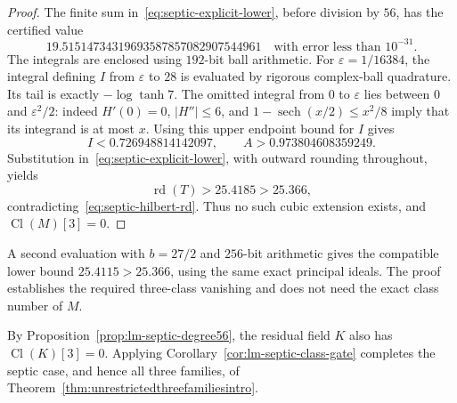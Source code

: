 \begin{proof}
The finite sum in~\eqref{eq:septic-explicit-lower}, before division by $56$, has the certified
value
\[
 19.51514734319693587857082907544961
 \quad\text{with error less than }10^{-31}.
\]
The integrals are enclosed using $192$-bit ball arithmetic.
For $\varepsilon=1/16384$, the integral defining $I$ from
$\varepsilon$ to $28$ is evaluated by rigorous complex-ball
quadrature. Its tail is exactly $-\log\tanh7$.
The omitted integral from $0$ to $\varepsilon$ lies between
$0$ and $\varepsilon^2/2$: indeed $H'(0)=0$, $|H''|\le6$,
and $1-\operatorname{sech}(x/2)\le x^2/8$ imply that its
integrand is at most $x$. Using this upper endpoint bound for
$I$ gives
\[
 I<0.726948814142097,
 \qquad A>0.973804608359249.
\]
Substitution in~\eqref{eq:septic-explicit-lower}, with outward rounding throughout, yields
\[
 \operatorname{rd}(T)>25.4185>25.366,
\]
contradicting~\eqref{eq:septic-hilbert-rd}. Thus no such cubic extension exists, and
$\operatorname{Cl}(M)[3]=0$.
\end{proof}

A second evaluation with $b=27/2$ and $256$-bit arithmetic gives
the compatible lower bound $25.4115>25.366$, using the same exact
principal ideals. The proof establishes the required three-class
vanishing and does not need the exact class number of $M$.

By Proposition~\ref{prop:lm-septic-degree56}, the residual field
$K$ also has $\operatorname{Cl}(K)[3]=0$. Applying
Corollary~\ref{cor:lm-septic-class-gate} completes the septic
case, and hence all three families, of
Theorem~\ref{thm:unrestrictedthreefamiliesintro}.
